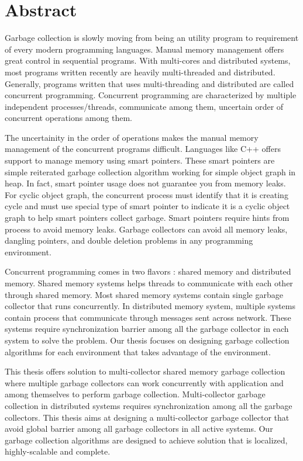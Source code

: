 \chapter*{Abstract}
\label{ch:abstract}
Garbage collection is slowly moving from being an utility program to requirement of every modern programming languages. Manual memory management offers great control in sequential programs. With multi-cores and distributed systems, most programs written recently are heavily multi-threaded and distributed. Generally, programs written that uses multi-threading and distributed are called concurrent programming. Concurrent programming are characterized by multiple independent processes/threads, communicate among them, uncertain order of concurrent operations among them.

The uncertainity in the order of operations makes the manual memory management of the concurrent programs difficult. Languages like C++ offers support to manage memory using smart pointers. These smart pointers are simple reiterated garbage collection algorithm working for simple object graph in heap. In fact, smart pointer usage does not guarantee you from memory leaks. For cyclic object graph, the concurrent process must identify that it is creating cycle and must use special type of smart pointer to indicate it is a cyclic object graph to help smart pointers collect garbage. Smart pointers require hints from process to avoid memory leaks. Garbage collectors can avoid all memory leaks, dangling pointers, and double deletion problems in any programming environment. 

Concurrent programming comes in two flavors : shared memory and distributed memory. Shared memory systems helps threads to communicate with each other through shared memory. Most shared memory systems contain single garbage collector that runs concurrently. In distributed memory system, multiple systems contain process that communicate through messages sent across network. These systems require synchronization barrier among all the garbage collector in each system to solve the problem. Our thesis focuses on designing garbage collection algorithms for each environment that takes advantage of the environment. 

This thesis offers solution to multi-collector shared memory garbage collection where multiple garbage collectors can work concurrently with application and among themselves to perform garbage collection. Multi-collector garbage collection in distributed systems requires synchronization among all the garbage collectors. This thesis aims at designing a multi-collector garbage collector that avoid global barrier among all garbage collectors in all active systems. Our garbage collection algorithms are designed to achieve solution that is localized, highly-scalable and complete.

